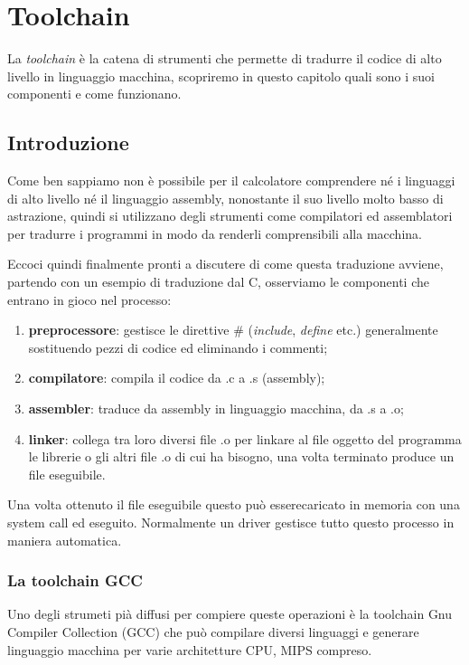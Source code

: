 \documentclass[class=book, crop=false, oneside]{standalone}
\begin{document}
\chapter{Toolchain}

La \emph{toolchain} è la catena di strumenti che permette di tradurre il codice di alto livello in linguaggio macchina, scopriremo in questo capitolo quali sono i suoi componenti e come funzionano.

\section{Introduzione}

Come ben sappiamo non è possibile per il calcolatore comprendere né i linguaggi di alto livello né il linguaggio assembly, nonostante il suo livello molto basso di astrazione, quindi si utilizzano degli strumenti come compilatori ed assemblatori per tradurre i programmi in modo da renderli comprensibili alla macchina.

Eccoci quindi finalmente pronti a discutere di come questa traduzione avviene, partendo con un esempio di traduzione dal C, osserviamo le componenti che entrano in gioco nel processo:
\begin{enumerate}
	\item \textbf{preprocessore}: gestisce le direttive \# (\emph{include}, \emph{define} etc.) generalmente sostituendo pezzi di codice ed eliminando i commenti;
	\item \textbf{compilatore}: compila il codice da .c a .s (assembly);
	\item \textbf{assembler}: traduce da assembly in linguaggio macchina, da .s a .o;
	\item \textbf{linker}: collega tra loro diversi file .o per linkare al file oggetto del programma le librerie o gli altri file .o di cui ha bisogno, una volta terminato produce un file eseguibile.
\end{enumerate}
Una volta ottenuto il file eseguibile questo può esserecaricato in memoria con una system call ed eseguito.
Normalmente un driver gestisce tutto questo processo in maniera automatica.

\subsection*{La toolchain GCC}
Uno degli strumeti pià diffusi per compiere queste operazioni è la toolchain Gnu Compiler Collection (GCC) che può compilare diversi linguaggi e generare linguaggio macchina per varie architetture CPU, MIPS compreso.
\end{document}
